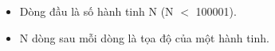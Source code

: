 \begin{itemize}
	\item     Dòng đầu là số hành tinh N (N $<$ 100001).   
	\item     N dòng sau mỗi dòng là tọa độ của một hành tinh.   
\end{itemize}